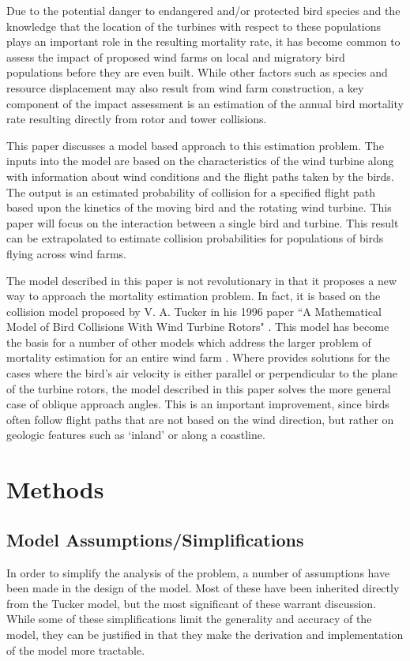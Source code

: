 \documentclass[10pt,conference]{IEEEtran}
\begin{document}
Due to the potential danger to endangered and/or protected bird species and the knowledge that the location of the
turbines with respect to these populations plays an important role in the resulting mortality rate, it has become
common to assess the impact of proposed wind farms on local and migratory bird populations before they are even built.
While other factors such as species and resource displacement may also result from wind farm construction, a key
component of the impact assessment is an estimation of the annual bird mortality rate resulting directly from rotor and
tower collisions.

This paper discusses a model based approach to this estimation problem. The inputs into the model are based on the
characteristics of the wind turbine along with information about wind conditions and the flight paths taken by the
birds. The output is an estimated probability of collision for a specified flight path based upon the kinetics of the
moving bird and the rotating wind turbine. This paper will focus on the interaction between a single bird and turbine.
This result can be extrapolated to estimate collision probabilities for populations of birds flying across wind farms.

The model described in this paper is not revolutionary in that it proposes a new way to approach the mortality
estimation problem. In fact, it is based on the collision model proposed by V. A. Tucker in his 1996 paper ``A
Mathematical Model of Bird Collisions With Wind Turbine Rotors" \cite{Tucker1996}. This model has become the basis for
a number of other models which address the larger problem of mortality estimation for an entire wind farm
\cite{Cooper2004}\cite{Madders2006}. Where \cite{Tucker1996} provides solutions for the cases where the bird's air
velocity is either parallel or perpendicular to the plane of the turbine rotors, the model described in this paper
solves the more general case of oblique approach angles. This is an important improvement, since birds often follow
flight paths that are not based on the wind direction, but rather on geologic features such as `inland' or along a
coastline.

\section{Methods}
\subsection{Model Assumptions/Simplifications}
In order to simplify the analysis of the problem, a number of assumptions have been made in the design of the model.
Most of these have been inherited directly from the Tucker model, but the most significant of these warrant discussion.
While some of these simplifications limit the generality and accuracy of the model, they can be justified in that they
make the derivation and implementation of the model more tractable.
\end{document}
